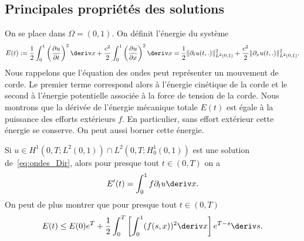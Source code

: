 \documentclass[12pt,a4paper,twoside]{article}
\begin{document}
\subsection{Principales propri\'et\'es des solutions}

On se place dans $\Omega = (0,1)$.
On d\'efinit l'\'energie du syst\`eme
\begin{align*}
  E(t) := \frac12 \int_0^1 \left( \frac{\partial u}{\partial t} \right)^2 \deriv x
  + \frac{c^2}{2} \int_0^1 \left( \frac{\partial u}{\partial x} \right)^2 \deriv x
  = \frac12 \| \partial_t u (t,.)\|_{L^2(0,1)}^2 + \frac{c^2}2 \| \partial_x u (t,.)\|_{L^2(0,1)}^2.
\end{align*}
Nous rappelons que l'\'equation des ondes peut repr\'esenter un mouvement de corde.
Le premier terme correspond alors \`a l'\'energie cin\'etique de la corde
et le second \`a  l'\'energie potentielle associ\'ee \`a la force de tension de la corde.
Nous montrons que la d\'eriv\'ee de l'\'energie m\'ecanique totale $E(t)$ est \'egale
\`a la puissance des efforts ext\'erieurs $f$.
En particulier, sans effort ext\'erieur cette \'energie se conserve.
On peut aussi borner cette \'energie.

\begin{proposition}
  \label{prop:ondes_donnees}
  Si $u \in H^1(0,T;L^2(0,1)) \cap L^2(0,T;H^1_0(0,1))$ est une solution de~\eqref{eq:ondes_Dir},
  alors pour presque tout $t \in (0,T)$
  on a 
  \begin{align*}
    E'(t) = \int_0^1 f \partial_t u \deriv x .
  \end{align*}
  On peut de plus montrer que pour presque tout $t \in (0,T)$
  \begin{align}
    \label{eq:energy}
    E(t) \leq E(0) e^T
    + \frac{1}{2} \int_0^T \left[ \int_0^1 (f(s,x))^2 \deriv x \right] e^{T-s} \deriv s.
  \end{align}
\end{proposition}
\end{document}
